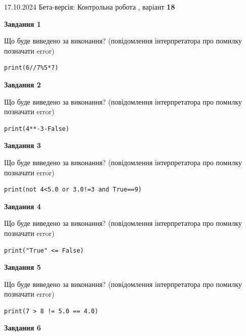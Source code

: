 \documentclass[12pt, ukrainian]{article}
\begin{document}
{\Large{17.10.2024 Бета-версія: Контрольна робота , варіант  \No \textbf { 18 }\par}}
{
\begin {large}
{\begin {center}\textbf{Завдання 1}\end {center}}

Що буде виведено за виконання? (повідомлення інтерпретатора про помилку позначати error)\par
\begin{verbatim}
print(6//7%5*7)
\end{verbatim}

{\begin {center}\textbf{Завдання 2}\end {center}}

Що буде виведено за виконання? (повідомлення інтерпретатора про помилку позначати error)\par
\begin{verbatim}
print(4**-3-False)
\end{verbatim}

{\begin {center}\textbf{Завдання 3}\end {center}}

Що буде виведено за виконання? (повідомлення інтерпретатора про помилку позначати error)\par
\begin{verbatim}
print(not 4<5.0 or 3.0!=3 and True==9)
\end{verbatim}

{\begin {center}\textbf{Завдання 4}\end {center}}

Що буде виведено за виконання? (повідомлення інтерпретатора про помилку позначати error)\par
\begin{verbatim}
print("True" <= False)
\end{verbatim}

{\begin {center}\textbf{Завдання 5}\end {center}}

Що буде виведено за виконання? (повідомлення інтерпретатора про помилку позначати error)\par
\begin{verbatim}
print(7 > 8 != 5.0 == 4.0)
\end{verbatim}

{\begin {center}\textbf{Завдання 6}\end {center}}


\end{large}}
\end{document}
